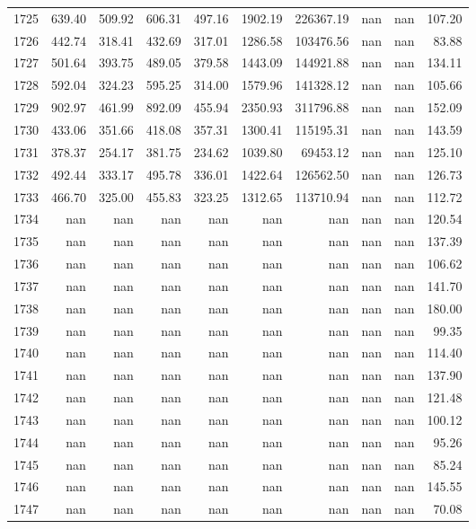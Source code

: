 \begin{tabular}{lrrrrrrrrr}
1725 & 639.40 & 509.92 & 606.31 & 497.16 & 1902.19 & 226367.19 & nan & nan & 107.20 \\
1726 & 442.74 & 318.41 & 432.69 & 317.01 & 1286.58 & 103476.56 & nan & nan & 83.88 \\
1727 & 501.64 & 393.75 & 489.05 & 379.58 & 1443.09 & 144921.88 & nan & nan & 134.11 \\
1728 & 592.04 & 324.23 & 595.25 & 314.00 & 1579.96 & 141328.12 & nan & nan & 105.66 \\
1729 & 902.97 & 461.99 & 892.09 & 455.94 & 2350.93 & 311796.88 & nan & nan & 152.09 \\
1730 & 433.06 & 351.66 & 418.08 & 357.31 & 1300.41 & 115195.31 & nan & nan & 143.59 \\
1731 & 378.37 & 254.17 & 381.75 & 234.62 & 1039.80 & 69453.12 & nan & nan & 125.10 \\
1732 & 492.44 & 333.17 & 495.78 & 336.01 & 1422.64 & 126562.50 & nan & nan & 126.73 \\
1733 & 466.70 & 325.00 & 455.83 & 323.25 & 1312.65 & 113710.94 & nan & nan & 112.72 \\
1734 & nan & nan & nan & nan & nan & nan & nan & nan & 120.54 \\
1735 & nan & nan & nan & nan & nan & nan & nan & nan & 137.39 \\
1736 & nan & nan & nan & nan & nan & nan & nan & nan & 106.62 \\
1737 & nan & nan & nan & nan & nan & nan & nan & nan & 141.70 \\
1738 & nan & nan & nan & nan & nan & nan & nan & nan & 180.00 \\
1739 & nan & nan & nan & nan & nan & nan & nan & nan & 99.35 \\
1740 & nan & nan & nan & nan & nan & nan & nan & nan & 114.40 \\
1741 & nan & nan & nan & nan & nan & nan & nan & nan & 137.90 \\
1742 & nan & nan & nan & nan & nan & nan & nan & nan & 121.48 \\
1743 & nan & nan & nan & nan & nan & nan & nan & nan & 100.12 \\
1744 & nan & nan & nan & nan & nan & nan & nan & nan & 95.26 \\
1745 & nan & nan & nan & nan & nan & nan & nan & nan & 85.24 \\
1746 & nan & nan & nan & nan & nan & nan & nan & nan & 145.55 \\
1747 & nan & nan & nan & nan & nan & nan & nan & nan & 70.08 \\

\end{tabular}
